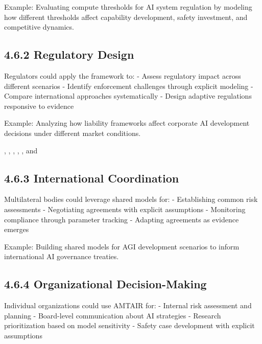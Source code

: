 \documentclass[
  11pt,
  letterpaper,
]{book}
\begin{document}
Example: Evaluating compute thresholds for AI system regulation by
modeling how different thresholds affect capability development, safety
investment, and competitive dynamics.

\subsection*{4.6.2 Regulatory Design}\label{sec-regulatory-integration}

Regulators could apply the framework to: - Assess regulatory impact
across different scenarios - Identify enforcement challenges through
explicit modeling - Compare international approaches systematically -
Design adaptive regulations responsive to evidence

Example: Analyzing how liability frameworks affect corporate AI
development decisions under different market conditions.

\textcite{cuomo2016}, \textcite{demirag2000}, \textcite{devilliers2021},
\textcite{divito2022}, \textcite{kaur2024}, \textcite{list2011} and
\textcite{solomon2020}

\subsection*{4.6.3 International
Coordination}\label{sec-international-integration}

Multilateral bodies could leverage shared models for: - Establishing
common risk assessments - Negotiating agreements with explicit
assumptions - Monitoring compliance through parameter tracking -
Adapting agreements as evidence emerges

Example: Building shared models for AGI development scenarios to inform
international AI governance treaties.

\subsection*{4.6.4 Organizational
Decision-Making}\label{sec-organizational-integration}

Individual organizations could use AMTAIR for: - Internal risk
assessment and planning - Board-level communication about AI strategies
- Research prioritization based on model sensitivity - Safety case
development with explicit assumptions
\end{document}
